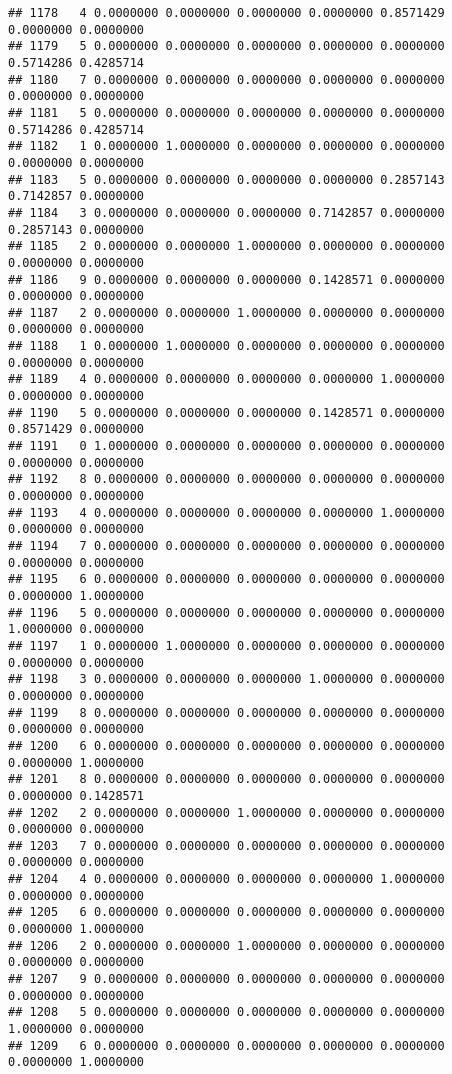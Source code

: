\documentclass[
]{article}
\begin{document}
\begin{verbatim}
## 1178   4 0.0000000 0.0000000 0.0000000 0.0000000 0.8571429 0.0000000 0.0000000
## 1179   5 0.0000000 0.0000000 0.0000000 0.0000000 0.0000000 0.5714286 0.4285714
## 1180   7 0.0000000 0.0000000 0.0000000 0.0000000 0.0000000 0.0000000 0.0000000
## 1181   5 0.0000000 0.0000000 0.0000000 0.0000000 0.0000000 0.5714286 0.4285714
## 1182   1 0.0000000 1.0000000 0.0000000 0.0000000 0.0000000 0.0000000 0.0000000
## 1183   5 0.0000000 0.0000000 0.0000000 0.0000000 0.2857143 0.7142857 0.0000000
## 1184   3 0.0000000 0.0000000 0.0000000 0.7142857 0.0000000 0.2857143 0.0000000
## 1185   2 0.0000000 0.0000000 1.0000000 0.0000000 0.0000000 0.0000000 0.0000000
## 1186   9 0.0000000 0.0000000 0.0000000 0.1428571 0.0000000 0.0000000 0.0000000
## 1187   2 0.0000000 0.0000000 1.0000000 0.0000000 0.0000000 0.0000000 0.0000000
## 1188   1 0.0000000 1.0000000 0.0000000 0.0000000 0.0000000 0.0000000 0.0000000
## 1189   4 0.0000000 0.0000000 0.0000000 0.0000000 1.0000000 0.0000000 0.0000000
## 1190   5 0.0000000 0.0000000 0.0000000 0.1428571 0.0000000 0.8571429 0.0000000
## 1191   0 1.0000000 0.0000000 0.0000000 0.0000000 0.0000000 0.0000000 0.0000000
## 1192   8 0.0000000 0.0000000 0.0000000 0.0000000 0.0000000 0.0000000 0.0000000
## 1193   4 0.0000000 0.0000000 0.0000000 0.0000000 1.0000000 0.0000000 0.0000000
## 1194   7 0.0000000 0.0000000 0.0000000 0.0000000 0.0000000 0.0000000 0.0000000
## 1195   6 0.0000000 0.0000000 0.0000000 0.0000000 0.0000000 0.0000000 1.0000000
## 1196   5 0.0000000 0.0000000 0.0000000 0.0000000 0.0000000 1.0000000 0.0000000
## 1197   1 0.0000000 1.0000000 0.0000000 0.0000000 0.0000000 0.0000000 0.0000000
## 1198   3 0.0000000 0.0000000 0.0000000 1.0000000 0.0000000 0.0000000 0.0000000
## 1199   8 0.0000000 0.0000000 0.0000000 0.0000000 0.0000000 0.0000000 0.0000000
## 1200   6 0.0000000 0.0000000 0.0000000 0.0000000 0.0000000 0.0000000 1.0000000
## 1201   8 0.0000000 0.0000000 0.0000000 0.0000000 0.0000000 0.0000000 0.1428571
## 1202   2 0.0000000 0.0000000 1.0000000 0.0000000 0.0000000 0.0000000 0.0000000
## 1203   7 0.0000000 0.0000000 0.0000000 0.0000000 0.0000000 0.0000000 0.0000000
## 1204   4 0.0000000 0.0000000 0.0000000 0.0000000 1.0000000 0.0000000 0.0000000
## 1205   6 0.0000000 0.0000000 0.0000000 0.0000000 0.0000000 0.0000000 1.0000000
## 1206   2 0.0000000 0.0000000 1.0000000 0.0000000 0.0000000 0.0000000 0.0000000
## 1207   9 0.0000000 0.0000000 0.0000000 0.0000000 0.0000000 0.0000000 0.0000000
## 1208   5 0.0000000 0.0000000 0.0000000 0.0000000 0.0000000 1.0000000 0.0000000
## 1209   6 0.0000000 0.0000000 0.0000000 0.0000000 0.0000000 0.0000000 1.0000000

\end{verbatim}
\end{document}

